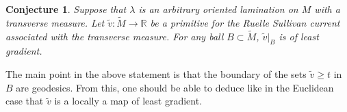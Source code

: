 \documentclass{ip-journal}
\newtheorem{problem}[theorem]{Problem}
\newtheorem{conjecture}[theorem]{Conjecture}
\theoremstyle{definition}
\numberwithin{equation}{section}
\newcommand{\R}{\mathbb R}
\begin{document}
  
  \begin{conjecture} Suppose that $\lambda$ is an arbitrary oriented lamination on $M$ with a transverse measure.  Let $\tilde v: \tilde M \rightarrow \R$ be a primitive for the Ruelle Sullivan current associated with the transverse measure. For any ball $B \subset \tilde M$, 
  $\tilde v \big|_B$ is of least gradient.
  \end{conjecture}
  
  The main point in the above statement is that the boundary of the sets $\tilde v \geq t$ in $B$ are geodesics. From this, one should be able to deduce like in the Euclidean case that $\tilde v$ is a locally a map of least gradient. 
%
\end{document}
